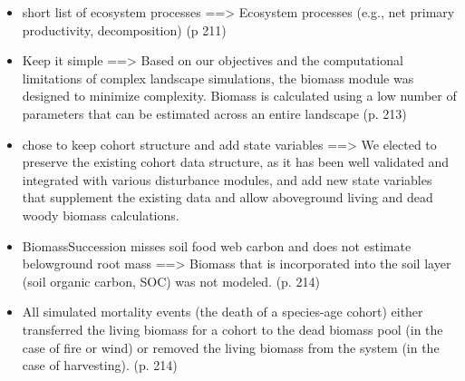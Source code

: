 \documentclass[twoside]{article}	%
\begin{document}
\begin{itemize}
  \item short list of ecosystem processes ==> Ecosystem processes (e.g., net primary productivity, decomposition) (p 211)
  \item Keep it simple ==> Based on our objectives and the computational limitations of complex landscape simulations, the biomass module was designed to minimize complexity. Biomass is calculated using a low number of parameters that can be estimated across an entire landscape (p. 213)
  \item chose to keep cohort structure and add state variables ==> We elected to preserve the existing cohort data structure, as it has been well validated and integrated with various disturbance modules, and add new state variables that supplement the existing data and allow aboveground living and dead woody biomass calculations.
  \item BiomassSuccession misses soil food web carbon and does not estimate belowground root mass ==> Biomass that is incorporated into the soil layer (soil organic carbon, SOC) was not modeled. (p. 214)
  \item All simulated mortality events (the death of a species-age cohort) either transferred the living biomass for a cohort to the dead biomass pool (in the case of fire or wind) or removed the living biomass from the system (in the case of harvesting). (p. 214)
  

\end{itemize}
\end{document}

